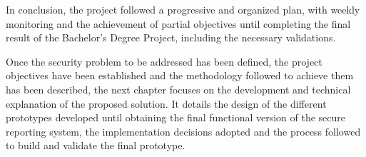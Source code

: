 In conclusion, the project followed a progressive and organized plan, with weekly monitoring and the achievement of partial objectives until completing the final result of the Bachelor's Degree Project, including the necessary validations.

\newpage

Once the security problem to be addressed has been defined, the project objectives have been established and the methodology followed to achieve them has been described, the next chapter focuses on the development and technical explanation of the proposed solution.
It details the design of the different prototypes developed until obtaining the final functional version of the secure reporting system, the implementation decisions adopted and the process followed to build and validate the final prototype.
